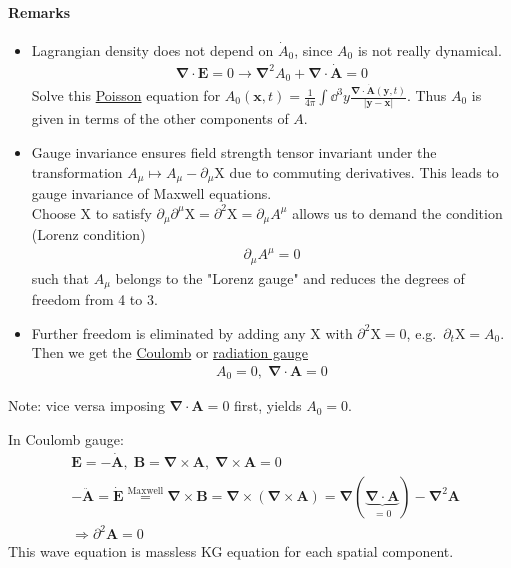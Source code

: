 \paragraph{Remarks}
\begin{itemize}
	\item Lagrangian density does not depend on $\dot{A}_0$, since $A_0$ is not really dynamical.
	\begin{align*}
		\pmb{\nabla}\cdot \pmb{E} = 0 \rightarrow \pmb{\nabla}^2 A_0 + \pmb{\nabla}\cdot \dot{\pmb{A}} = 0 
	\end{align*}
	Solve this \underline{Poisson} equation for $A_0(\pmb{x},t) = \frac{1}{4\pi}\int \dd^3 y \frac{\pmb{\nabla}\cdot \dot{\pmb{A}}(\pmb{y},t)}{|\pmb{y}-\pmb{x}|}$. Thus $A_0$ is given in terms of the other components of $A$.
	\item Gauge invariance ensures field strength tensor invariant under the transformation $A_\mu \longmapsto A_\mu - \partial_\mu \text{X}$ due to commuting derivatives. This leads to gauge invariance of Maxwell equations.\\
	Choose X to satisfy $\partial_\mu \partial^\mu \text{X} = \partial^2\text{X}=\partial_\mu A^\mu$ allows us to demand the condition  (Lorenz condition)
		\begin{align}
			\partial_\mu A^\mu = 0
		\end{align}
	such that $A_\mu$ belongs to the "Lorenz gauge" and reduces the degrees of freedom from 4 to 3.
		\item Further freedom is eliminated by adding any X with $\partial^2 \text{X} = 0$, e.g.~$\partial_t \text{X} = A_0$. Then we get the \underline{Coulomb} or \underline{radiation gauge}
		\begin{align}
			A_0 = 0,\; \pmb{\nabla}\cdot \pmb{A} = 0
		\end{align}
\end{itemize}

Note: vice versa imposing $\pmb{\nabla} \cdot \pmb{A} = 0$ first, yields $A_0 = 0$.

In Coulomb gauge:
\begin{align*}
	&\pmb{E} = -\dot{\pmb{A}},\; \pmb{B} = \pmb{\nabla} \times \pmb{A},\; \pmb{\nabla}\times \pmb{A} = 0 \\
	&-\ddot{\pmb{A}} = \dot{\pmb{E}} \stackrel{\text{Maxwell}}{=} \pmb{\nabla} \times \pmb{B} =  \pmb{\nabla} \times (\pmb{\nabla} \times \pmb{A}) = \pmb{\nabla}(\underbrace{\pmb{\nabla}\cdot\pmb{A}}_{=0}) - \pmb{\nabla}^2 \pmb{A} \\
	&\Rightarrow \partial^2 \pmb{A} = 0
\end{align*}
This wave equation is massless KG equation for each spatial component.

